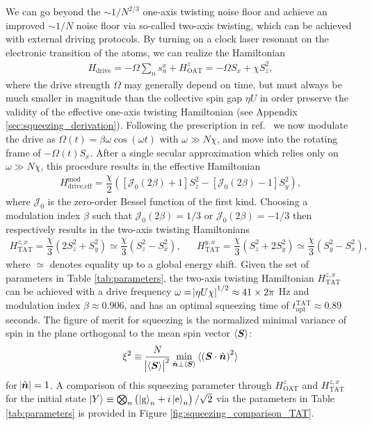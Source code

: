 \documentclass[aps,notitlepage,nofootinbib,11pt]{revtex4-1}
\renewcommand{\t}{\text} %
\newcommand{\f}[2]{\dfrac{#1}{#2}} %
\newcommand{\p}[1]{\left(#1\right)} %
\renewcommand{\sp}[1]{\left[#1\right]} %
\renewcommand{\v}{\bm} %
\renewcommand{\c}{\cdot} %
\newcommand{\bk}{\braket} %
\newcommand{\g}{\text{g}} %
\newcommand{\e}{\text{e}}
\newcommand{\J}{\mathcal{J}}
\newcommand{\1}{\mathds{1}}
\begin{document}
We can go beyond the $\sim1/N^{2/3}$ one-axis twisting noise floor and
achieve an improved $\sim1/N$ noise floor via so-called two-axis
twisting, which can be achieved with external driving protocols.  By
turning on a clock laser resonant on the electronic transition of the
atoms, we can realize the Hamiltonian
\begin{align}
  H_{\t{drive}} = -\Omega \sum_n s_n^x + H_{\t{OAT}}^z
  = -\Omega S_x + \chi S_z^2,
\end{align}
where the drive strength $\Omega$ may generally depend on time, but
must always be much smaller in magnitude than the collective spin gap
$\eta U$ in order preserve the validity of the effective one-axis
twisting Hamiltonian (see Appendix \ref{sec:squeezing_derivation}).
Following the prescription in ref.~\cite{huang2015twoaxis} we now
modulate the drive as $\Omega\p{t}=\beta\omega\cos\p{\omega t}$ with
$\omega\gg N\chi$, and move into the rotating frame of
$-\Omega\p{t}S_x$.  After a single secular approximation which relies
only on $\omega\gg N\chi$, this procedure results in the effective
Hamiltonian
\begin{align}
  H_{\t{drive,eff}}^{\t{mod}}
  = \f{\chi}{2} \p{\sp{\J_0\p{2\beta}+1} S_z^2
    - \sp{\J_0\p{2\beta}-1} S_y^2},
\end{align}
where $\J_0$ is the zero-order Bessel function of the first kind.
Choosing a modulation index $\beta$ such that $\J_0\p{2\beta}=1/3$ or
$\J_0\p{2\beta}=-1/3$ then respectively results in the two-axis
twisting Hamiltonians
\begin{align}
  H_{\t{TAT}}^{z,x}
  = \f{\chi}{3} \p{2 S_z^2 + S_y^2}
  \simeq \f{\chi}{3} \p{S_z^2 - S_x^2},
  &&
  H_{\t{TAT}}^{y,x}
  = \f{\chi}{3} \p{S_z^2 + 2 S_y^2}
  \simeq \f{\chi}{3}\p{S_y^2 - S_x^2},
  \label{eq:H_TAT_drive}
\end{align}
where $\simeq$ denotes equality up to a global energy shift.  Given
the set of parameters in Table \ref{tab:parameters}, the two-axis
twisting Hamiltonian $H_{\t{TAT}}^{z,x}$ can be achieved with a drive
frequency $\omega=\abs{\eta U\chi}^{1/2}\approx41\times2\pi$ Hz and
modulation index $\beta\approx0.906$, and has an optimal squeezing
time of $t_{\t{opt}}^{\t{TAT}}\approx0.89$ seconds.  The figure of
merit for squeezing is the normalized minimal variance of spin in the
plane orthogonal to the mean spin vector $\bk{\v S}$:
\begin{align}
  \xi^2 \equiv \f{N}{\abs{\bk{\v S}}^2}
  \min_{\hat{\v n}\perp\bk{\v S}} \bk{\p{\v S\c\hat{\v n}}^2}
\end{align}
for $\abs{\hat{\v n}}=1$.  A comparison of this squeezing parameter
through $H_{\t{OAT}}^z$ and $H_{\t{TAT}}^{z,x}$ for the initial state
$\ket{Y}\equiv\bigotimes_n\p{\ket{\g}_n+i\ket{\e}_n}/\sqrt2$ via the
parameters in Table \ref{tab:parameters} is provided in Figure
\ref{fig:squeezing_comparison_TAT}.
\end{document}
